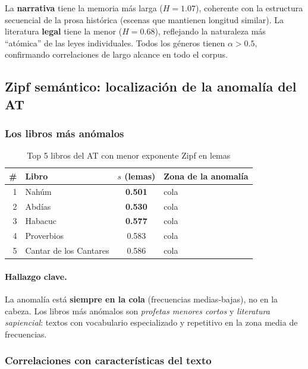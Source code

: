 \documentclass[12pt,a4paper]{article}
\newcommand{\val}[1]{\textcolor{hlcolor}{\textbf{#1}}}
\begin{document}
La \textbf{narrativa} tiene la memoria m\'as larga ($H = 1.07$), coherente con la estructura
secuencial de la prosa hist\'orica (escenas que mantienen longitud similar). La literatura
\textbf{legal} tiene la menor ($H = 0.68$), reflejando la naturaleza m\'as ``at\'omica'' de
las leyes individuales. Todos los g\'eneros tienen $\alpha > 0.5$, confirmando correlaciones
de largo alcance en todo el corpus.

\subsection{Zipf sem\'antico: localizaci\'on de la anomal\'ia del AT}

\subsubsection{Los libros m\'as an\'omalos}

\begin{table}[H]
\centering
\caption{Top 5 libros del AT con menor exponente Zipf en lemas}
\label{tab:top5anomalous}
\begin{tabular}{rlcl}
\toprule
\textbf{\#} & \textbf{Libro} & \textbf{$s$ (lemas)} & \textbf{Zona de la anomal\'ia} \\
\midrule
1 & Nah\'um               & \val{0.501} & cola \\
2 & Abd\'ias              & \val{0.530} & cola \\
3 & Habacuc               & \val{0.577} & cola \\
4 & Proverbios            & 0.583 & cola \\
5 & Cantar de los Cantares & 0.586 & cola \\
\bottomrule
\end{tabular}
\end{table}

\paragraph{Hallazgo clave.}
La anomal\'ia est\'a \textbf{siempre en la cola} (frecuencias medias-bajas), no en la cabeza.
Los libros m\'as an\'omalos son \emph{profetas menores cortos} y \emph{literatura sapiencial}:
textos con vocabulario especializado y repetitivo en la zona media de frecuencias.

\subsubsection{Correlaciones con caracter\'isticas del texto}
\end{document}
